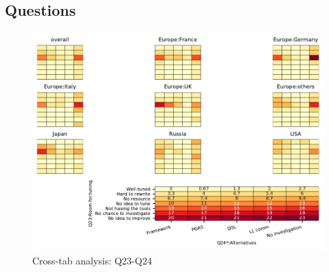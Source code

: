 
\subsection{Questions}


\begin{figure}
\begin{center}
\includegraphics[width=12cm]{../pdfs/Q23-Q24.pdf}
\caption{Cross-tab analysis: Q23-Q24}
\label{fig:Q23-Q24}
\end{center}
\end{figure}
